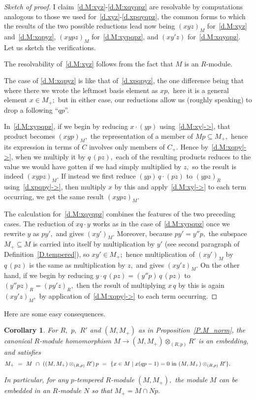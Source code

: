 \documentclass{amsart}
\newtheorem{corollary}[theorem]{Corollary}
\begin{document}
\begin{proof}[Sketch of proof]
I claim~\eqref{d.M:xyz}-\eqref{d.M:xqyqpz} are resolvable by
computations analogous
to those we used for~\eqref{d.xyz}-\eqref{d.xpqyqpz},
the common forms to which the results of the two
possible reductions lead now being $(xyz)_M$
for~\eqref{d.M:xyz} and~\eqref{d.M:xqpyz},
$(xypz)_M$ for~\eqref{d.M:xypqpz},
and $(xy'z)$ for~\eqref{d.M:xqyqpz}.
Let us sketch the verifications.

The resolvability of~\eqref{d.M:xyz} follows from the
fact that $M$ is an $\!R\!$-module.

The case of \eqref{d.M:xqpyz} is like that of~\eqref{d.xpqpyz},
the one difference being that
where there we wrote the leftmost basis element as $xp,$
here it is a general element $x\in M_+;$ but in either case,
our reductions allow us (roughly speaking) to drop a following ``$qp$''.

In~\eqref{d.M:xypqpz}, if we begin by reducing $x\cdot (yp)$
using~\eqref{d.M:xy|->}, that product becomes
$(xyp)_M,$ the representation of a member of $Mp\subseteq M_+,$
hence its expression in terms of $C$ involves only members of $C_+.$
Hence by~\eqref{d.M:xqpy|->}, when we multiply it by $q\,(pz),$
each of the resulting products reduces to the value we
would have gotten if
we had simply multiplied by $z,$ so the result is indeed $(xypz)_M.$
If instead we first reduce $(yp)\,q\cdot (pz)$ to $(ypz)_R$
using~\eqref{d.xpqpy|->}, then multiply $x$ by this and
apply~\eqref{d.M:xy|->} to each term
occurring, we get the same result $(xypz)_M.$

The calculation for~\eqref{d.M:xqyqpz} combines the features of the
two preceding cases.
The reduction of $xq\cdot y$ works as in the case of~\eqref{d.M:xypqpz}
once we rewrite $y$ as $py',$ and gives $(xy')_M.$
Moreover, because $py'=y''p,$ the subspace $M_+\subseteq M$ is carried
into itself by multiplication by $y'$ (see second paragraph of
Definition~\ref{D.tempered}), so $xy'\in M_+;$ hence multiplication of
$(xy')_M$ by $q\,(pz)$ is the same as multiplication
by $z,$ and gives $(xy'z)_M.$
On the other hand, if we begin by reducing
$y\cdot q\,(pz)=(y''p)\,q\,(pz)$
to $(y''pz)_R=(py'z)_R,$ then the result of multiplying $x\,q$ by
this is again $(xy'z)_M,$ by application of~\eqref{d.M:xqpy|->} to each
term occurring.
\end{proof}

Here are some easy consequences.

\begin{corollary}\label{C.M->MOX}
For $R,$ $p,$ $R'$ and $(M,M_+)$ as in Proposition~\ref{P.M_norm}, the
canonical $\!R\!$-module homomorphism $M\to(M,M_+)\otimes_{(R,p)} R'$
is an embedding, and satisfies
\begin{equation}\begin{minipage}[c]{35pc}\label{d.M+=}
$M_+\ =\ M\ \cap\ ((M,M_+)\otimes_{(R,p)} R')\,p\ =
\ \{x\in M\mid x(qp-1)=0$ in $(M,M_+)\otimes_{(R,p)} R'\}.$
\end{minipage}\end{equation}

In particular, for any $\!p\!$-tempered $\!R\!$-module $(M,M_+),$
the module $M$ can be embedded in an $\!R\!$-module $N$ so that
$M_+=M\cap Np.$
\end{corollary}
\end{document}
